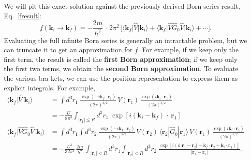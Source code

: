 \documentclass[pra,12pt]{revtex4-2}
\begin{document}
We will pit this exact solution against the previously-derived Born
series result, Eq.~\eqref{fresult}:
\begin{equation}
  f(\mathbf{k}_i\rightarrow \mathbf{k}_f) = - \frac{2m}{\hbar^2} \,\cdot \, 2\pi^2 \, \Bigg[\big\langle \mathbf{k}_f\big| \hat{V}|\mathbf{k}_i\big\rangle + \big\langle \mathbf{k}_f \big| \hat{V}\hat{G}_0 \hat{V} \big|\mathbf{k}_i\big\rangle + \cdots \Bigg].
  \label{fexpression}
\end{equation}
Evaluating the full infinite Born series is generally an intractable
problem, but we can truncate it to get an approximation for $f$.  For
example, if we keep only the first term, the result is called the
\textbf{first Born approximation}; if we keep only the first two
terms, we obtain the \textbf{second Born approximation}.  To evaluate
the various bra-kets, we can use the position representation to
express them as explicit integrals.  For example,
\begin{align}
  \big\langle \mathbf{k}_f\big| \hat{V}|\mathbf{k}_i\big\rangle
  &= \int d^3r_1\; \frac{\exp(-i\mathbf{k}_f \cdot \mathbf{r}_1)}{(2\pi)^{3/2}} \, V(\mathbf{r}_1) \, \frac{\exp(i\mathbf{k}_i \cdot \mathbf{r}_1)}{(2\pi)^{3/2}}
  \nonumber \\
  &= - \frac{U}{8\pi^3} \int_{|\mathbf{r}_1| \le R} d^3r_1 \; \exp\left[i(\mathbf{k}_i-\mathbf{k}_f)\, \cdot\, \mathbf{r}_1\right] \label{singleint}\\
  \big\langle \mathbf{k}_f \big| \hat{V}\hat{G}_0 \hat{V} \big|\mathbf{k}_i\big\rangle &=
  \int d^3r_1 \!\! \int d^3r_2 \; \frac{\exp(-i\mathbf{k}_f \cdot \mathbf{r}_2)}{(2\pi)^{3/2}} \, V(\mathbf{r}_2) \, \langle\mathbf{r}_2|\hat{G}_0|\mathbf{r}_1 \rangle \, V(\mathbf{r}_1)\, \frac{\exp(i\mathbf{k}_i \cdot \mathbf{r}_1)}{(2\pi)^{3/2}} \nonumber \\
  &= - \frac{U^2}{32\pi^4} \, \frac{2m}{\hbar^2}\, \int_{|\mathbf{r}_1|<R} d^3 r_1 \int_{|\mathbf{r}_2|<R} d^3 r_2 \; \frac{\exp\left[i(k|\mathbf{r}_1-\mathbf{r}_2| - \mathbf{k}_f \cdot \mathbf{r}_2 +\mathbf{k}_i \cdot \mathbf{r}_1)\right]}{|\mathbf{r}_1-\mathbf{r}_2|}.
  \label{doubleint}
\end{align}
\end{document}
